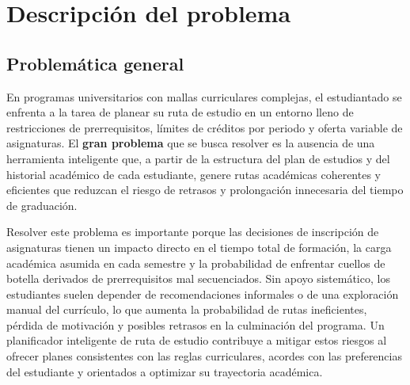 \section{Descripción del problema}

\subsection{Problemática general}
En programas universitarios con mallas curriculares complejas, el estudiantado se enfrenta a la tarea de planear su ruta de estudio en un entorno lleno de restricciones de prerrequisitos, límites de créditos por periodo y oferta variable de asignaturas. El \textbf{gran problema} que se busca resolver es la ausencia de una herramienta inteligente que, a partir de la estructura del plan de estudios y del historial académico de cada estudiante, genere rutas académicas coherentes y eficientes que reduzcan el riesgo de retrasos y prolongación innecesaria del tiempo de graduación.

Resolver este problema es importante porque las decisiones de inscripción de asignaturas tienen un impacto directo en el tiempo total de formación, la carga académica asumida en cada semestre y la probabilidad de enfrentar cuellos de botella derivados de prerrequisitos mal secuenciados. Sin apoyo sistemático, los estudiantes suelen depender de recomendaciones informales o de una exploración manual del currículo, lo que aumenta la probabilidad de rutas ineficientes, pérdida de motivación y posibles retrasos en la culminación del programa. Un planificador inteligente de ruta de estudio contribuye a mitigar estos riesgos al ofrecer planes consistentes con las reglas curriculares, acordes con las preferencias del estudiante y orientados a optimizar su trayectoria académica.

\pagebreak